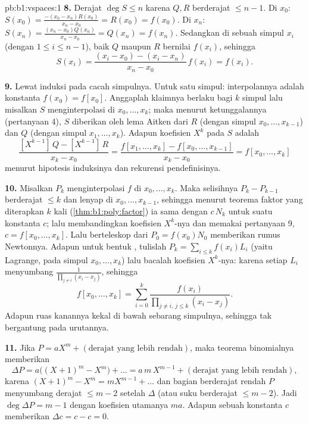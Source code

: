 \begin{solution}{pb:b1:vspaces:1}
\textbf{8.} Derajat $\deg S \leq n$ karena $Q, R$ berderajat $\leq n - 1$.
Di $x_0$: $S(x_0) = \frac{-(x_0 - x_n) R(x_0)}{x_n - x_0} =
R(x_0) = f(x_0)$. Di $x_n$: $S(x_n) = \frac{(x_n - x_0)
Q(x_n)}{x_n - x_0} = Q(x_n) = f(x_n)$. Sedangkan di sebuah simpul  $x_i$
(dengan $1 \leq i \leq n-1$), baik $Q$ maupun $R$ bernilai $f(x_i)$,
sehingga
\[
S(x_i) = \frac{(x_i - x_0) - (x_i - x_n)}{x_n - x_0}\, f(x_i)
= f(x_i) .
\]

\textbf{9.} Lewat induksi pada cacah simpulnya. Untuk satu simpul:
interpolannya adalah konstanta $f(x_0) = f[x_0]$. Anggaplah klaimnya berlaku
bagi $k$ simpul lalu misalkan $S$ menginterpolasi di $x_0, \dots, x_k$; maka menurut
ketunggalannya (pertanyaan 4), $S$ diberikan oleh lema Aitken dari $R$
(dengan simpul $x_0, \dots, x_{k-1}$) dan $Q$ (dengan simpul $x_1, \dots, x_k$).
Adapun koefisien $X^{k}$ pada $S$ adalah
\[
\frac{[X^{k-1}]\,Q - [X^{k-1}]\,R}{x_k - x_0}
= \frac{f[x_1, \dots, x_k] - f[x_0, \dots, x_{k-1}]}{x_k - x_0}
= f[x_0, \dots, x_k]
\]
menurut hipotesis induksinya dan rekurensi pendefinisinya.

\textbf{10.} Misalkan $P_k$ menginterpolasi $f$ di $x_0, \dots, x_k$. Maka
selisihnya $P_k - P_{k-1}$ berderajat $\leq k$ dan lenyap di
$x_0, \dots, x_{k-1}$, sehingga menurut teorema faktor yang diterapkan $k$ kali
(\cref{thm:b1:poly:factor}) ia sama dengan $c\,N_k$ untuk suatu konstanta $c$;
lalu membandingkan koefisien $X^{k}$-nya dan memakai pertanyaan 9, $c =
f[x_0, \dots, x_k]$. Lalu berteleskop dari $P_0 = f(x_0) N_0$ memberikan
rumus Newtonnya. Adapun untuk bentuk , tulislah $P_k = \sum_{i \leq
k} f(x_i) L_i$ (yaitu Lagrange, pada simpul $x_0, \dots, x_k$) lalu bacalah
koefisien $X^{k}$-nya: karena setiap $L_i$ menyumbang
$\frac{1}{\prod_{j \neq i}(x_i - x_j)}$, sehingga
\[
f[x_0, \dots, x_k] = \sum_{i=0}^{k}
\frac{f(x_i)}{\prod_{j \neq i,\, j \leq k}(x_i - x_j)} .
\]
Adapun ruas kanannya kekal di bawah sebarang  simpulnya, sehingga
 tak bergantung pada urutannya.

\textbf{11.} Jika $P = a X^m + (\text{derajat yang lebih rendah})$, maka teorema
binomialnya memberikan
\[
\Delta P = a\bigl((X+1)^m - X^m\bigr) + \dots
= a\,m\,X^{m-1} + (\text{derajat yang lebih rendah}),
\]
karena $(X+1)^m - X^m = m X^{m-1} + \dots$ dan bagian berderajat rendah
$P$ menyumbang derajat $\leq m - 2$ setelah $\Delta$ (atau
suku berderajat $\leq m-2$). Jadi $\deg \Delta P = m - 1$ dengan koefisien
utamanya $m a$. Adapun sebuah konstanta $c$ memberikan $\Delta c = c - c = 0$.


\end{solution}
